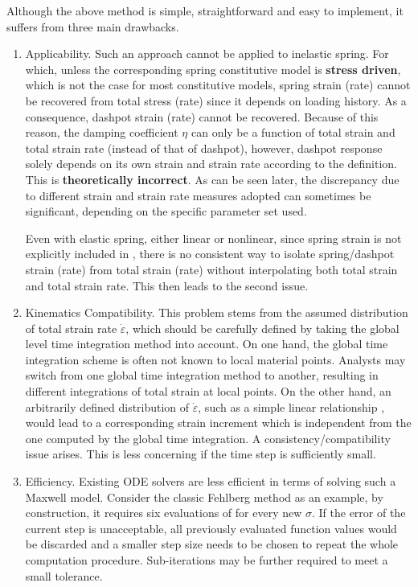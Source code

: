 Although the above method is simple, straightforward and easy to implement, it suffers from three main drawbacks.
\begin{enumerate}
\item
Applicability. Such an approach cannot be applied to inelastic spring. For which, unless the corresponding spring constitutive model is \textbf{stress driven}, which is not the case for most constitutive models, spring strain (rate) cannot be recovered from total stress (rate) since it depends on loading history. As a consequence, dashpot strain (rate) cannot be recovered. Because of this reason, the damping coefficient $\eta$ can only be a function of total strain and total strain rate (instead of that of dashpot), however, dashpot response solely depends on its own strain and strain rate according to the definition. This is \textbf{theoretically incorrect}. As can be seen later, the discrepancy due to different strain and strain rate measures adopted can sometimes be significant, depending on the specific parameter set used.

Even with elastic spring, either linear or nonlinear, since spring strain is not explicitly included in , there is no consistent way to isolate spring/dashpot strain (rate) from total strain (rate) without interpolating both total strain and total strain rate. This then leads to the second issue.
\item
Kinematics Compatibility. This problem stems from the assumed distribution of total strain rate $\dot\varepsilon$, which should be carefully defined by taking the global level time integration method into account. On one hand, the global time integration scheme is often not known to local material points. Analysts may switch from one global time integration method to another, resulting in different integrations of total strain at local points. On the other hand, an arbitrarily defined distribution of $\dot\varepsilon$, such as a simple linear relationship \cite{Akcelyan2018}, would lead to a corresponding strain increment which is independent from the one computed by the global time integration. A consistency/compatibility issue arises. This is less concerning if the time step is sufficiently small.
\item
Efficiency. Existing ODE solvers are less efficient in terms of solving such a Maxwell model. Consider the classic Fehlberg method \cite{Fehlberg1969} as an example, by construction, it requires six evaluations of  for every new $\sigma$. If the error of the current step is unacceptable, all previously evaluated function values would be discarded and a smaller step size needs to be chosen to repeat the whole computation procedure. Sub-iterations may be further required to meet a small tolerance.


\end{enumerate}
